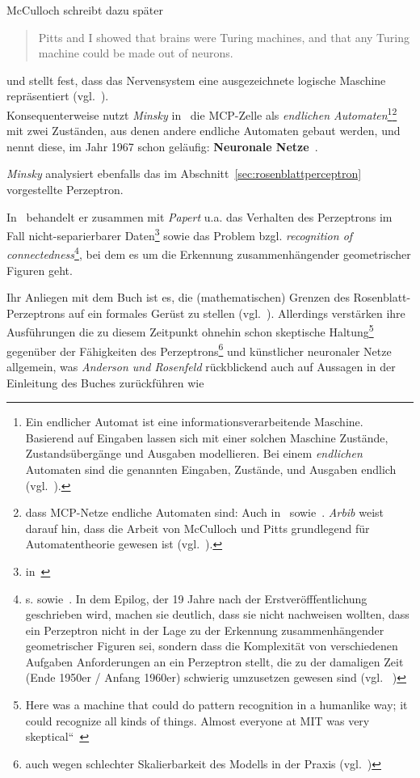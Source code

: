 McCulloch schreibt dazu später

\blockquote[{\cite[164]{Mcc16}}]{
    Pitts and I showed that brains were Turing machines, and that any Turing machine could be made out of neurons.
}

\noindent
und stellt fest, dass das Nervensystem eine ausgezeichnete logische Maschine repräsentiert (vgl.~\cite[80]{Mcc16}).\\


Konsequenterweise nutzt \textit{Minsky} in~\cite[32 ff.]{Min67} die MCP-Zelle als \textit{endlichen Automaten}\footnote{
    Ein endlicher Automat ist eine informationsverarbeitende Maschine. Basierend auf Eingaben lassen sich mit einer solchen Maschine Zustände, Zustandsübergänge und Ausgaben modellieren. Bei einem \textit{endlichen} Automaten sind die genannten Eingaben, Zustände, und Ausgaben endlich (vgl.~\cite[26 ff.]{SSH95}).
}\footnote{
    dass MCP-Netze endliche Automaten sind: Auch in~\cite[76]{Cow90} sowie~\cite[47, ``Satz 2.4``]{Roj93}. \textit{Arbib} weist darauf hin, dass die Arbeit von McCulloch und Pitts grundlegend für Automatentheorie gewesen ist (vgl.~\cite[8]{Arb19}).
} mit zwei Zuständen, aus denen andere endliche Automaten gebaut werden, und nennt diese, im Jahr 1967 schon geläufig: \textbf{Neuronale Netze}~\cite[33]{Min67}.

%

\textit{Minsky} analysiert ebenfalls das im Abschnitt~\ref{sec:rosenblattperceptron} vorgestellte Perzeptron.


In~\cite{MP88} behandelt er zusammen mit \textit{Papert} u.a. das Verhalten des Perzeptrons im Fall nicht-separierbarer Daten\footnote{
    in~\cite[181 ff.]{MP88}
} sowie das Problem bzgl. \textit{recognition of connectedness}\footnote{
    s. \cite[12, ``Theorem 0.8``]{MP88} sowie~\cite[249 f.]{MP88}. In dem Epilog, der 19 Jahre nach der Erstveröfffentlichung geschrieben wird, machen sie deutlich, dass sie nicht nachweisen wollten, dass ein Perzeptron nicht in der Lage zu der Erkennung zusammenhängender geometrischer Figuren sei, sondern dass die Komplexität von verschiedenen Aufgaben Anforderungen an ein Perzeptron stellt, die zu der damaligen Zeit (Ende 1950er / Anfang 1960er) schwierig umzusetzen gewesen sind (vgl. ~\cite[250]{MP88})
}, bei dem es um die Erkennung zusammenhängender geometrischer Figuren geht.

Ihr Anliegen mit dem Buch ist es, die (mathematischen) Grenzen des Rosenblatt-Perzeptrons auf ein formales Gerüst zu stellen (vgl.~\cite[249]{MP88}).
Allerdings verstärken ihre Ausführungen die zu diesem Zeitpunkt ohnehin schon skeptische Haltung\footnote{
    Here was a machine that could do pattern recognition in a humanlike way; it could recognize all kinds of things. Almost everyone at MIT was very skeptical``~\cite[99]{AR98}
} gegenüber der Fähigkeiten des Perzeptrons\footnote{
    auch wegen schlechter Skalierbarkeit des Modells in der Praxis (vgl.~\cite[159]{AR88})
} und künstlicher neuronaler Netze allgemein, was \textit{Anderson und Rosenfeld} rückblickend auch auf Aussagen in der Einleitung des Buches zurückführen wie

